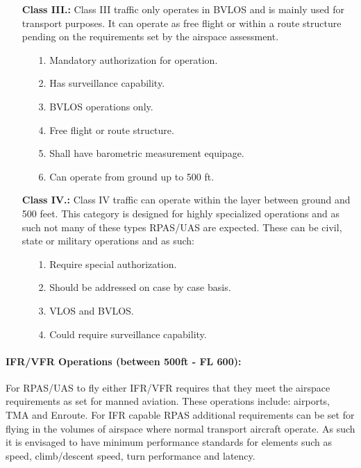 \begin{itemize}
    
    \item[\textbf{Class III.:}] Class III traffic only operates in BVLOS and is mainly used for transport purposes. It can operate as free flight or within a route structure pending on the requirements set by the airspace assessment.
    \begin{itemize}
        \item[1.] Mandatory authorization for operation.
        
        \item[2.] Has surveillance capability.
        
        \item[3.] BVLOS operations only.
        
        \item[4.] Free flight or route structure.
        
        \item[5.] Shall have barometric measurement equipage.
        
        \item[6.] Can operate from ground up to 500 ft.
    \end{itemize}
    
    \item[\textbf{Class IV.:}] Class IV traffic can operate within the layer between ground and 500 feet. This category is designed for highly specialized operations and as such not many of these types RPAS/UAS are expected. These can be civil, state or military operations and as such:
    \begin{itemize}
        \item[1.] Require special authorization.
        
        \item[2.] Should be addressed on case by case basis.
        
        \item[3.] VLOS and BVLOS.
        
        \item[4.] Could require surveillance capability.
    \end{itemize}
\end{itemize}

\paragraph{IFR/VFR Operations (between 500ft - FL 600):} For RPAS/UAS to fly either IFR/VFR requires that they meet the airspace requirements as set for manned aviation. These operations include: airports, TMA and Enroute. For IFR capable RPAS additional requirements can be set for flying in the volumes of airspace where normal transport aircraft operate. As such it is envisaged to have minimum performance standards for elements such as speed, climb/descent speed, turn performance and latency.

